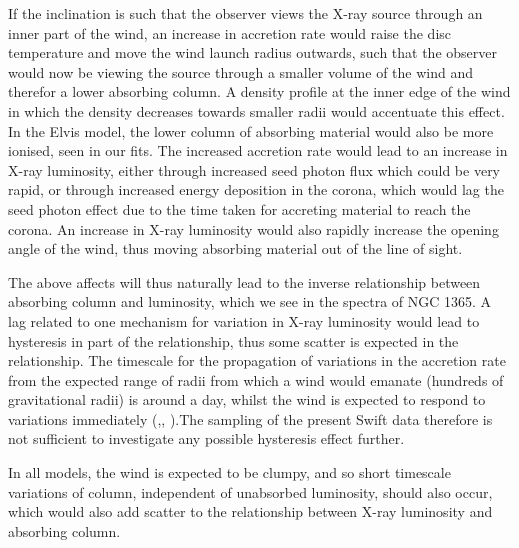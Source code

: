 \documentclass[useAMS,usenatbib]{sam}
\begin{document}
If the inclination is such that the observer views the X-ray source through an inner part of the wind, an increase in accretion rate would raise the disc temperature and
move the wind launch radius outwards, such that the observer would now be viewing the source through a smaller volume of the wind and therefor a lower absorbing column.
A density profile at the inner edge of the wind in which the density decreases towards smaller radii would accentuate this effect. In the Elvis model, the lower column
of absorbing material would also be more ionised, seen in our fits. The increased accretion rate would lead to an increase in X-ray luminosity, either through increased
seed photon flux which could be very rapid, or through increased energy deposition in the corona, which would lag the seed photon effect due to the time taken for
accreting material to reach the corona. An increase in X-ray luminosity would also rapidly increase the opening angle of the wind, thus moving absorbing material out of
the line of sight.

The above affects will thus naturally lead to the inverse relationship between absorbing column and luminosity, which we see in the spectra of NGC 1365. A lag related to
one mechanism for variation in X-ray luminosity would lead to hysteresis in part of the relationship, thus some scatter is expected in the relationship. The timescale for
the propagation of variations in the accretion rate from the expected range of radii from which a wind would emanate (hundreds of gravitational radii) is around a day,
whilst the wind is expected to respond to variations immediately (\citet{treves},\citet{shakura}, \citet{tombesi}).The sampling of the present Swift data therefore is not
sufficient to investigate any possible hysteresis effect further. 

In all models, the wind is expected to be clumpy, and so short timescale variations of column, independent of unabsorbed luminosity, should also occur, which would also
add scatter to the relationship between X-ray luminosity and absorbing column.


\end{document}
